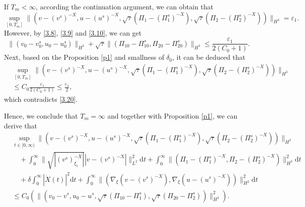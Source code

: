 \documentclass[10pt,reqno]{amsart}
\numberwithin{equation}{section}
\newcommand{\dif}{\mathrm{d}}
\begin{document}
If $T_m<\infty$, according the continuation argument, we can obtain that
\begin{equation}\label{3.20}
\sup\limits_{[0, T_m]} \|(v-(v^s)^{-X}, u-(u^s)^{-X}, \sqrt{\tau}(\Pi_1-(\Pi^s_1)^{-X}), \sqrt{\tau}(\Pi_2-(\Pi^s_2)^{-X}))\|_{H^3}=\varepsilon_1.
\end{equation}
However, by \eqref{3.8}, \eqref{3.9} and \eqref{3.10}, we can get
\begin{equation}\nonumber
\|(v_0-v^s_0,u_0-u^s_0)\|_{H^3}
+\sqrt\tau\|(\Pi_{10}-\Pi_{10}^s, \Pi_{20}-\Pi_{20}^s)\|_{H^3}
\le \frac{\varepsilon_1}{2(C_0+1)}.
\end{equation}
Next, based on the Proposition \ref{p1} and smallness of $\delta_0$, it can be deduced that
\begin{equation}\nonumber
\begin{aligned}
&\sup\limits_{[0, T_m]} \|(v-(v^s)^{-X}, u-(u^s)^{-X}, \sqrt{\tau}(\Pi_1-(\Pi^s_1)^{-X}), \sqrt{\tau}(\Pi_2-(\Pi^s_2)^{-X}))\|_{H^3}\\
&\le C_0\frac{\varepsilon_1}{2(C_0+1)}
\le \frac{\varepsilon_1}{2},
\end{aligned}
\end{equation}
which contradicts \eqref{3.20}.

Hence, we conclude that $T_m=\infty$ and together with Proposition \ref{p1}, we can derive that
\begin{equation}\label{3.23}
\begin{aligned}
&\sup\limits_{t\in[0, \infty)}\|(v-(v^s)^{-X}, u-(u^s)^{-X}, \sqrt{\tau}(\Pi_1-(\Pi^s_1)^{-X}), \sqrt{\tau}(\Pi_2-(\Pi^s_2)^{-X}))\|_{H^3}\\
&\quad+\int_0^{\infty}\|\sqrt{|(v^s)^{-X}_{\xi_1}|}|v-(v^s)^{-X}|\|_{L^2}^2\dif t
+\int_0^{\infty}\|(\Pi_1-(\Pi_1^s)^{-X}, \Pi_2-(\Pi_2^s)^{-X})\|^2_{H^3}\dif t
\\
&\quad+\delta\int_0^{\infty}|\dot X(t)|^2\dif t
+\int_0^{\infty}\|\left(\nabla_\xi(v-(v^s)^{-X}),\nabla_\xi (u-(u^s)^{-X})\right)\|^2_{H^2}\dif t
\\
&\leq C_0\left(\|(v_0-v^s, u_0-u^s,
\sqrt{\tau}(\Pi_{10}-\Pi_{1}^s), \sqrt{\tau}(\Pi_{20}-\Pi_{2}^s))\|^2_{H^3}\right).
\end{aligned}
\end{equation}
\end{document}
